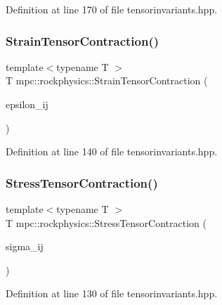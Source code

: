 Definition at line 170 of file tensorinvariants.\+hpp.

\mbox{\label{namespacempc_1_1rockphysics_a1fa58a28d857413244986ece16926de9}} 
\subsubsection{\texorpdfstring{Strain\+Tensor\+Contraction()}{StrainTensorContraction()}}
{\footnotesize\ttfamily template$<$typename T $>$ \\
T mpc\+::rockphysics\+::\+Strain\+Tensor\+Contraction (\begin{DoxyParamCaption}\item[{const \mbox{\hyperlink{structmpc_1_1core_1_1_strain_tensor}{mpc\+::core\+::\+Strain\+Tensor}}$<$ T $>$ \&}]{epsilon\+\_\+ij }\end{DoxyParamCaption})}



Definition at line 140 of file tensorinvariants.\+hpp.

\mbox{\label{namespacempc_1_1rockphysics_a8135f4b9ab5b9f0b03b8ce41688a8eda}} 
\subsubsection{\texorpdfstring{Stress\+Tensor\+Contraction()}{StressTensorContraction()}}
{\footnotesize\ttfamily template$<$typename T $>$ \\
T mpc\+::rockphysics\+::\+Stress\+Tensor\+Contraction (\begin{DoxyParamCaption}\item[{const \mbox{\hyperlink{structmpc_1_1core_1_1_stress_tensor}{mpc\+::core\+::\+Stress\+Tensor}}$<$ T $>$ \&}]{sigma\+\_\+ij }\end{DoxyParamCaption})}



Definition at line 130 of file tensorinvariants.\+hpp.

\mbox{\label{namespacempc_1_1rockphysics_a0b82ccff88d9a955297715f83cf19a8b}} 

